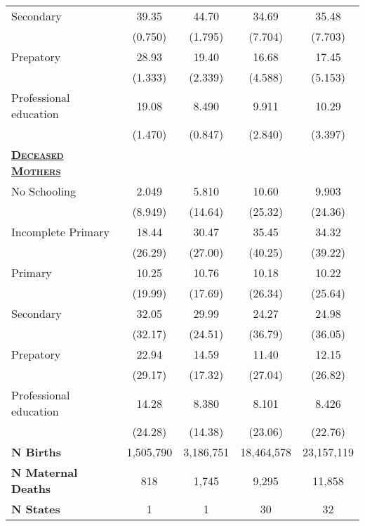 {\begin{tabular}{lcccc}
  Secondary&       39.35&       44.70&       34.69&       35.48\\
	&     (0.750)&     (1.795)&     (7.704)&     (7.703)\\
  Prepatory&       28.93&       19.40&       16.68&       17.45\\
	&     (1.333)&     (2.339)&     (4.588)&     (5.153)\\
	
  Professional education&       19.08&       8.490&       9.911&       10.29\\
	&     (1.470)&     (0.847)&     (2.840)&     (3.397)\\
	 
  
 \textsc{\textbf{\underline{Deceased Mothers}}}		&&&&\\
 
 
  No Schooling &       2.049&       5.810&       10.60&       9.903\\
	&     (8.949)&     (14.64)&     (25.32)&     (24.36)\\
  Incomplete Primary &       18.44&       30.47&       35.45&       34.32\\
	&     (26.29)&     (27.00)&     (40.25)&     (39.22)\\
  Primary  &       10.25&       10.76&       10.18&       10.22\\
	&     (19.99)&     (17.69)&     (26.34)&     (25.64)\\
  Secondary &       32.05&       29.99&       24.27&       24.98\\
	&     (32.17)&     (24.51)&     (36.79)&     (36.05)\\
  Prepatory &       22.94&       14.59&       11.40&       12.15\\
	&     (29.17)&     (17.32)&     (27.04)&     (26.82)\\
  Professional education &       14.28&       8.380&       8.101&       8.426\\
	&     (24.28)&     (14.38)&     (23.06)&     (22.76)\\\hline
\textbf{N Births}& 1,505,790 & 3,186,751& 18,464,578& 23,157,119  \\ 
\textbf{N Maternal Deaths}& 818 & 1,745 & 9,295 & 11,858\\
\textbf{N States} & 1&1&30&32\\
 	\hline\hline
\end{tabular}}
 
 
 